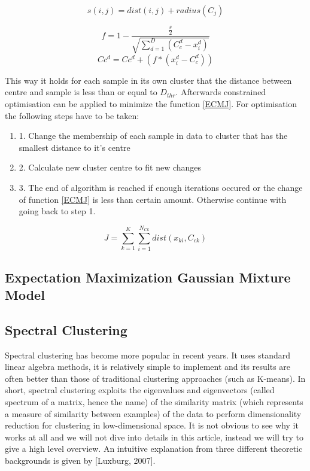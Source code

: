 \documentclass[conference]{IEEEtran}
\begin{document}
\begin{equation}\label{ECMequ1}
s(i, j) = dist(i,j) + radius(C_j)
\end{equation}

\begin{equation}\label{ECMequ2}
f = 1 - \frac {\frac {s} {2}} {\sqrt{ \sum_{d=1}^{D} (C_c^d - x_i^d)}}
\end{equation}
\begin{equation}\label{ECMequ3}
Cc^d = Cc^d + (f * (x_i^d - C_c^d))
\end{equation}

This way it holds for each sample in its own cluster that the distance between centre and sample is less than or equal to $D_{thr}$. Afterwards constrained optimisation can be applied to minimize the function \ref{ECMJ}. For optimisation the following steps have to be taken:
\begin{enumerate}
\item 1. Change the membership of each sample in data to cluster that has the smallest distance to it's centre
\item 2. Calculate new cluster centre to fit new changes
\item 3. The end of algorithm is reached if enough iterations occured or the change of function \ref{ECMJ} is less than certain amount. Otherwise continue with going back to step 1.
\end{enumerate}

\begin{equation}\label{ECMJ}
J = \sum_{k=1}^K \sum_{i=1}^{N_{Ck}} dist(x_{ki}, C_{ck})
\end{equation}

\subsection{Expectation Maximization Gaussian Mixture Model}

\subsection{Spectral Clustering}
Spectral clustering has become more popular in recent years. It uses standard linear algebra
methods, it is relatively simple to implement and its results are often better than those of
traditional clustering approaches (such as K-means). In short, spectral clustering exploits the
eigenvalues and eigenvectors (called spectrum of a matrix, hence the name) of the similarity matrix
(which represents
a measure of similarity between examples) of the data to perform dimensionality reduction for
clustering in low-dimensional space. It is not obvious to see why it works at all
and we will not dive into details in this article, instead we will try to give a high level overview.
An intuitive explanation from three different theoretic backgrounds is given by [Luxburg, 2007].
\end{document}

